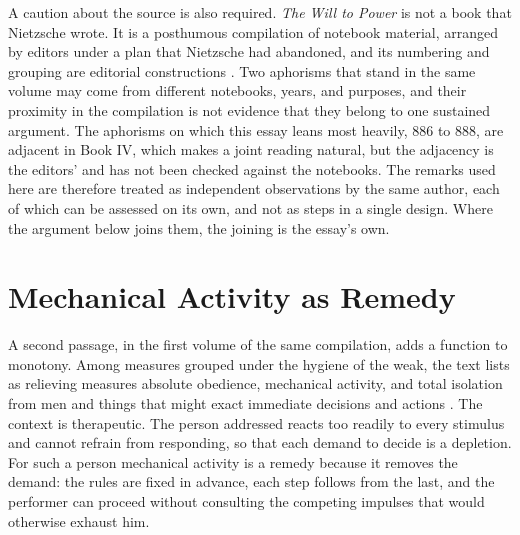 \documentclass[11pt]{article}
\begin{document}
A caution about the source is also required. \emph{The Will to Power} is not a book that Nietzsche wrote. It is a posthumous compilation of notebook material, arranged by editors under a plan that Nietzsche had abandoned, and its numbering and grouping are editorial constructions \cite{montinari2003}. Two aphorisms that stand in the same volume may come from different notebooks, years, and purposes, and their proximity in the compilation is not evidence that they belong to one sustained argument. The aphorisms on which this essay leans most heavily, 886 to 888, are adjacent in Book IV, which makes a joint reading natural, but the adjacency is the editors' and has not been checked against the notebooks. The remarks used here are therefore treated as independent observations by the same author, each of which can be assessed on its own, and not as steps in a single design. Where the argument below joins them, the joining is the essay's own.

\section{Mechanical Activity as Remedy}

A second passage, in the first volume of the same compilation, adds a function to monotony. Among measures grouped under the hygiene of the weak, the text lists as relieving measures absolute obedience, mechanical activity, and total isolation from men and things that might exact immediate decisions and actions \cite[Aph.\ 45]{wtp1}. The context is therapeutic. The person addressed reacts too readily to every stimulus and cannot refrain from responding, so that each demand to decide is a depletion. For such a person mechanical activity is a remedy because it removes the demand: the rules are fixed in advance, each step follows from the last, and the performer can proceed without consulting the competing impulses that would otherwise exhaust him.
\end{document}
